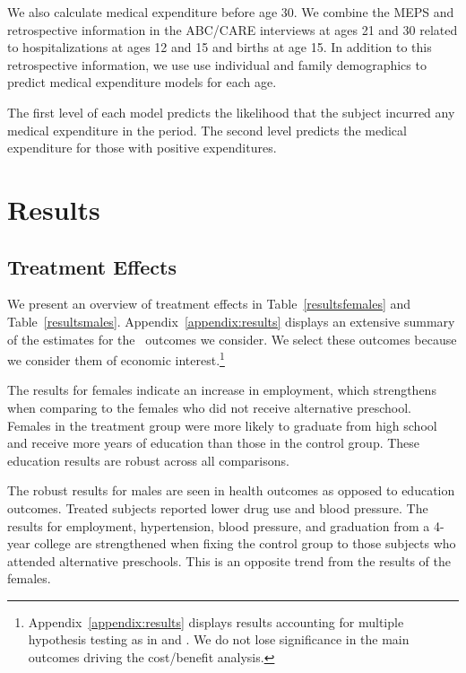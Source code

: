 We also calculate medical expenditure before age 30. We combine the MEPS and retrospective information in the ABC/CARE interviews at ages 21 and 30 related to hospitalizations at ages 12 and 15 and births at age 15. In addition to this retrospective information, we use use individual and family demographics to predict medical expenditure models for each age.

The first level of each model predicts the likelihood that the subject incurred any medical expenditure in the period. The second level predicts the medical expenditure for those with positive expenditures.

\section{Results} \label{section:results}

\subsection{Treatment Effects} \label{section:teresults}

We present an overview of treatment effects in Table~\ref{resultsfemales} and Table~\ref{resultsmales}. Appendix~\ref{appendix:results} displays an extensive summary of the estimates for the \noutcomes\ outcomes we consider. We select these outcomes because we consider them of economic interest.\footnote{Appendix~\ref{appendix:results} displays results accounting for multiple hypothesis testing as in \citet{Lehman_Romano_2005_AnnStat} and \citet{Romano_Shaikh_2006_AnnStat}. We do not lose significance in the main outcomes driving the cost/benefit analysis.}

The results for females indicate an increase in employment, which strengthens when comparing to the females who did not receive alternative preschool. Females in the treatment group were more likely to graduate from high school and receive more years of education than those in the control group. These education results are robust across all comparisons. 

The robust results for males are seen in health outcomes as opposed to education outcomes. Treated subjects reported lower drug use and blood pressure. The results for employment, hypertension, blood pressure, and graduation from a 4-year college are strengthened when fixing the control group to those subjects who attended alternative preschools. This is an opposite trend from the results of the females.

